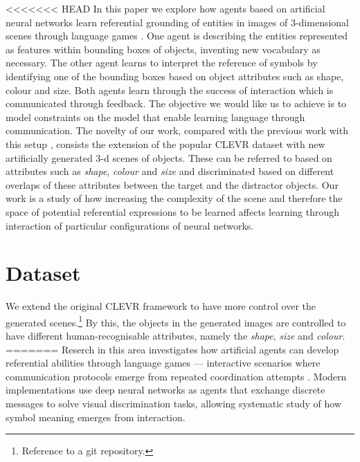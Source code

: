 \documentclass[11pt]{article}
\begin{document}
<<<<<<< HEAD
In this paper we explore how agents based on artificial neural networks learn referential grounding of entities in images of 3-dimensional scenes through language games \citep{Clark1996,Bartlett2005,Kirby2008,Steels2009,Zaslavsky2018}.
One agent is describing the entities represented as features within bounding boxes of objects, inventing new vocabulary as necessary. The other agent learns to interpret the reference of symbols by identifying one of the bounding boxes based on object attributes such as shape, colour and size.
Both agents learn through the success of interaction which is communicated through feedback.
The objective we would like us to achieve is to model constraints on the model that enable learning language through communication.
The novelty of our work, compared with the previous work with this setup \citep{Kharitonov2019,Lazaridou2017}, consists the extension of the popular CLEVR dataset \citep{Johnson2017a} with new artificially generated 3-d scenes of objects. These can be referred to based on attributes such as \emph{shape}, \emph{colour} and \emph{size} and discriminated based on different overlaps of these attributes between the target and the distractor objects.
Our work is  a study of how increasing the complexity of the scene and therefore the space of potential referential expressions to be learned affects learning through interaction of particular configurations of neural networks.


\section{Dataset}
We extend the original CLEVR framework \citep{Johnson2017a} to have more control over the generated scenes.\footnote{Reference to a git repository.} %
By this, the objects in the generated images are controlled to have different human-recognisable attributes, namely the \emph{shape}, \emph{size} and \emph{colour}.
=======
Reserch in this area investigates how artificial agents can develop referential abilities through language games — interactive scenarios where communication protocols emerge from repeated coordination attempts \citep{Clark1996,Bartlett2005,Kirby2008,Steels2009,Kharitonov2019,Lazaridou2017}. 
Modern implementations use deep neural networks as agents that exchange discrete messages to solve visual discrimination tasks, allowing systematic study of how symbol meaning emerges from interaction.
\end{document}
